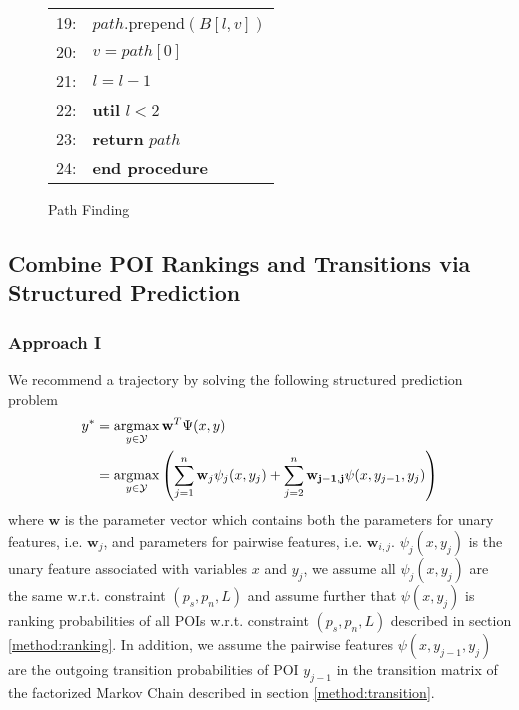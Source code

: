 \begin{figure}
\begin{tabular}{p{3pt}l}
19:&\hspace{20pt}     $path$.prepend$(B[l, v])$ \\
20:&\hspace{20pt}     $v = path[0]$ \\
21:&\hspace{20pt}     $l = l - 1$ \\
22:&\hspace{10pt} \textbf{util} $l < 2$ \\
23:&\hspace{10pt} \textbf{return} $path$ \\
24:&\textbf{end procedure} \\
\end{tabular}
\caption{Path Finding}
\label{fig:path}
\end{figure}


\subsection{Combine POI Rankings and Transitions via Structured Prediction}
\label{method:structured}
\subsubsection{Approach I}
We recommend a trajectory by solving the following structured prediction problem
\begin{align*}
    y^* &= \operatorname*{argmax}_{y \in \mathcal{Y}} \mathbf{w}^T \Psi(x, y) \\
        &= \operatorname*{argmax}_{y \in \mathcal{Y}} \left( \sum_{j=1}^n \mathbf{w}_j \psi_j(x, y_j) + 
                                              \sum_{j=2}^n \mathbf{w_{j-1,j}} \psi(x, y_{j-1}, y_j) \right)
\end{align*}
where $\mathbf{w}$ is the parameter vector which contains both the parameters for unary features, i.e. $\mathbf{w}_j$, 
and parameters for pairwise features, i.e. $\mathbf{w}_{i, j}$.
$\psi_j(x, y_j)$ is the unary feature associated with variables $x$ and $y_j$, 
we assume all $\psi_j(x, y_j)$ are the same w.r.t. constraint $(p_s, p_n, L)$ and assume further that
$\psi(x, y_j)$ is ranking probabilities of all POIs w.r.t. constraint $(p_s, p_n, L)$ described in section \ref{method:ranking}.
In addition, we assume the pairwise features $\psi(x, y_{j-1}, y_j)$ are the outgoing transition probabilities of 
POI $y_{j-1}$ in the transition matrix of the factorized Markov Chain described in section \ref{method:transition}.

